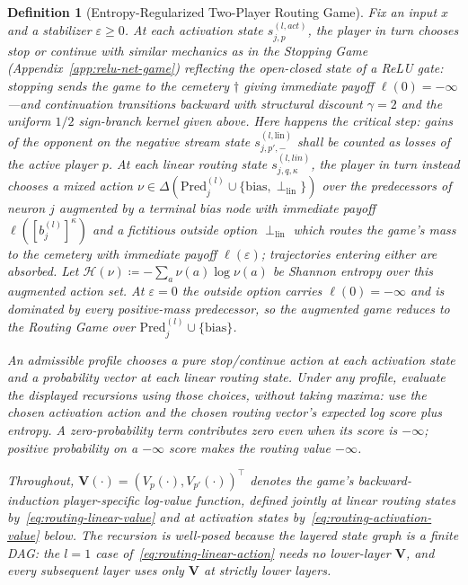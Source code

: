 \documentclass[twoside]{article}
\newcommand{\1}{\mathbf{1}}
\newtheorem{definition}{Definition}
\begin{document}
\begin{definition}[Entropy-Regularized Two-Player Routing Game]\label{def:routing-recursion}
Fix an input $x$ and a stabilizer $\varepsilon \ge 0$. At each activation state $s_{j,p}^{(l,
    act)}$, the player in turn chooses \emph{stop} or \emph{continue} with similar mechanics as in the
Stopping Game (Appendix~\ref{app:relu-net-game}) reflecting the open-closed state of a ReLU gate:
stopping sends the game to the cemetery $\dagger$ giving immediate payoff $\ell(0) = -\infty$---and
continuation transitions backward with structural discount $\gamma=2$ and the uniform $1/2$
sign-branch kernel given above. Here happens the critical step: gains of the opponent on the
negative stream state $s_{j,p',-}^{(l, \text{lin})}$ shall be counted as losses of the active
player $p$. At each linear routing state $s_{j,q,\kappa}^{(l, lin)}$, the player in turn instead
chooses a mixed action $\nu \in \Delta(\mathrm{Pred}_j^{(l)} \cup \{\mathrm{bias},
    \perp_{\mathrm{lin}}\})$ over the predecessors of neuron $j$ augmented by a terminal \emph{bias
node} with immediate payoff $\ell([b_j^{(l)}]^\kappa)$ and a fictitious \emph{outside option}
$\perp_{\mathrm{lin}}$ which routes the game's mass to the cemetery with immediate payoff $\ell
    (\varepsilon)$; trajectories entering either are absorbed. Let $\mathcal{H}(\nu) \coloneqq
    -\sum_{a} \nu(a)\log \nu(a)$ be Shannon entropy over this augmented action set. At $\varepsilon =
    0$ the outside option carries $\ell (0) = -\infty$ and is dominated by every positive-mass
predecessor, so the augmented game reduces to the Routing Game over $\mathrm{Pred}_j^{(l)} \cup
    \{\mathrm{bias}\}$.

An admissible profile chooses a pure stop/continue action at each activation state and a probability vector at each linear routing state. Under any profile, evaluate the displayed recursions using those choices, without taking maxima: use the chosen activation action and the chosen routing vector's expected log score plus entropy. A zero-probability term contributes zero even when its score is $-\infty$; positive probability on a $-\infty$ score makes the routing value $-\infty$.

Throughout, $\mathbf{V}(\cdot) = (V_p(\cdot), V_{p'}(\cdot))^\top$ denotes the game's
backward-induction player-specific log-value function, defined jointly at linear routing states
by~\eqref{eq:routing-linear-value} and at activation states by~\eqref{eq:routing-activation-value}
below. The recursion is well-posed because the layered state graph is a finite DAG: the $l=1$ case
of~\eqref{eq:routing-linear-action} needs no lower-layer $\mathbf{V}$, and every subsequent layer
uses only $\mathbf{V}$ at strictly lower layers.


\end{definition}
\end{document}
